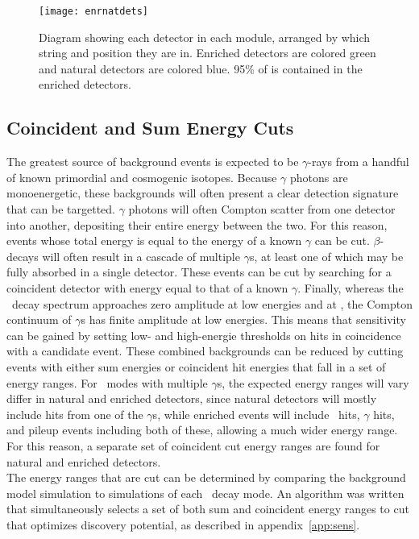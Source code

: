 \documentclass[/main.tex]{subfiles}
\begin{document}
\begin{figure}[h]
  \centering
  \texttt{[image: enrnatdets]}
  \caption[Module 1 and Module 2 enriched and natural detectors]{\label{fig:Ge76BBLevelDiagram}
    Diagram showing each detector in each module, arranged by which string and position they are in. Enriched detectors are colored green and natural detectors are colored blue. 95\% of  is contained in the enriched detectors.}
\end{figure}

\subsection{Coincident and Sum Energy Cuts} \label{sec:MSenergycuts}
The greatest source of background events is expected to be $\gamma$-rays from a handful of known primordial and cosmogenic isotopes.
Because $\gamma$ photons are monoenergetic, these backgrounds will often present a clear detection signature that can be targetted.
$\gamma$ photons will often Compton scatter from one detector into another, depositing their entire energy between the two.
For this reason, events whose total energy is equal to the energy of a known $\gamma$ can be cut.
$\beta$-decays will often result in a cascade of multiple $\gamma$s, at least one of which may be fully absorbed in a single detector.
These events can be cut by searching for a coincident detector with energy equal to that of a known $\gamma$.
Finally, whereas the \bb\ decay spectrum approaches zero amplitude at low energies and at \Qbb, the Compton continuum of $\gamma$s has finite amplitude at low energies.
This means that sensitivity can be gained by setting low- and high-energie thresholds on hits in coincidence with a candidate event.
These combined backgrounds can be reduced by cutting events with either sum energies or coincident hit energies that fall in a set of energy ranges.
For \bbes\ modes with multiple $\gamma$s, the expected energy ranges will vary differ in natural and enriched detectors, since natural detectors will mostly include hits from one of the $\gamma$s, while enriched events will include \bb\ hits, $\gamma$ hits, and pileup events including both of these, allowing a much wider energy range.
For this reason, a separate set of coincident cut energy ranges are found for natural and enriched detectors.
\\
The energy ranges that are cut can be determined by comparing the background model simulation to simulations of each \bbes\ decay mode.
An algorithm was written that simultaneously selects a set of both sum and coincident energy ranges to cut that optimizes discovery potential, as described in appendix~\ref{app:sens}.
\end{document}
